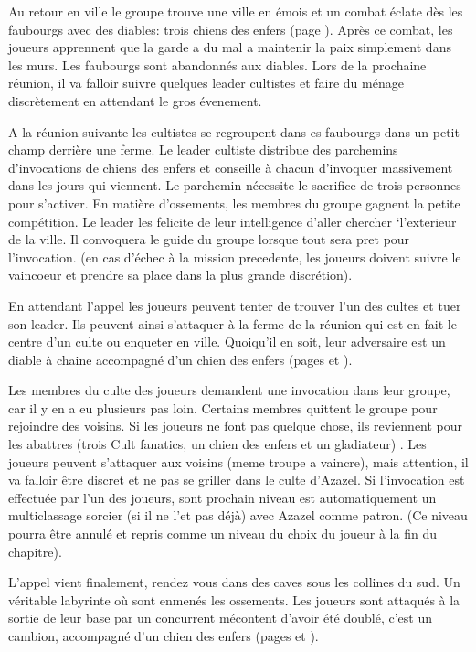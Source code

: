 Au retour en ville le groupe trouve une ville en émois et un combat éclate dès 
les faubourgs avec des diables: trois chiens des enfers 
(page \pageref{ChienEnfers}). Après ce combat, les joueurs apprennent
que la garde a du mal a maintenir la paix simplement dans les murs. Les faubourgs 
sont abandonnés aux diables. Lors de la prochaine réunion, il va falloir suivre
quelques leader cultistes et faire du ménage discrètement en attendant le gros 
évenement. 

A la réunion suivante les cultistes se regroupent dans es faubourgs dans un petit champ
derrière une ferme. Le leader cultiste distribue des parchemins d'invocations de chiens 
des enfers et conseille à chacun d'invoquer massivement dans les jours qui viennent.
Le parchemin nécessite le sacrifice de trois personnes pour s'activer. En matière 
d'ossements, les membres du groupe gagnent la petite compétition. Le leader
les felicite de leur intelligence d'aller chercher `l'exterieur de la ville. Il 
convoquera le guide du groupe lorsque tout sera pret pour l'invocation. (en cas d'échec
à la mission precedente, les joueurs doivent suivre le vaincoeur et prendre
sa place dans la plus grande discrétion).

En attendant l'appel les joueurs peuvent tenter de trouver l'un des cultes et tuer son 
leader. Ils peuvent ainsi s'attaquer à la ferme de la réunion qui est en fait le centre
d'un culte ou enqueter en ville. Quoiqu'il en soit, leur adversaire est un diable à 
chaine accompagné d'un chien des enfers (pages \pageref{DiableChaine} et \pageref{ChienEnfers}).

Les membres du culte des joueurs demandent une invocation dans leur groupe, car il y
en a eu plusieurs pas loin. Certains membres quittent le groupe pour rejoindre
des voisins. Si les joueurs ne font pas quelque chose, ils reviennent pour les
abattres (trois Cult fanatics, un chien des enfers et un gladiateur) . Les joueurs 
peuvent s'attaquer aux voisins (meme troupe a vaincre), mais attention, il va falloir 
être discret et ne pas se griller dans le culte d'Azazel. Si l'invocation est 
effectuée par l'un des joueurs, sont prochain niveau est automatiquement un 
multiclassage sorcier (si il ne l'et pas déjà) avec Azazel comme patron. (Ce niveau 
pourra être annulé et repris comme un niveau du choix du joueur à la fin du chapitre).

L'appel vient finalement, rendez vous dans des caves sous les collines du sud.
Un véritable labyrinte où sont enmenés les ossements. Les joueurs sont attaqués
à la sortie de leur base par un concurrent mécontent d'avoir été doublé, c'est
un cambion, accompagné d'un chien des enfers (pages \pageref{Cambion} et \pageref{ChienEnfers}).

